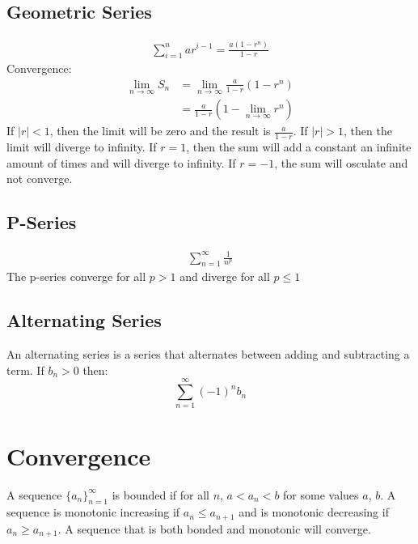 \documentclass{article}
\theoremstyle{mytheoremstyle}
\theoremstyle{mytheoremstyle}
\theoremstyle{myproblemstyle}
\begin{document}
    \subsection*{Geometric Series}
    \begin{align*}
        \sum_{i=1}^{n} ar^{i-1} = \frac{a(1-r^n)}{1-r}
    \end{align*}
    Convergence:
    \begin{align*}
        \lim_{n\to \infty} S_n &= \lim_{n\to \infty} \frac{a}{1-r} (1-r^n) \\
        &= \frac{a}{1-r} (1-\lim_{n\to \infty} r^n)
    \end{align*}
    If $|r|<1$, then the limit will be zero and the result is $\frac{a}{1-r}$.
    If $|r|>1$, then the limit will diverge to infinity. If $r=1$, then the sum
    will add a constant an infinite amount of times and will diverge to
    infinity. If $r=-1$, the sum will osculate and not converge.

    \subsection*{P-Series}
    \begin{align*}
        \sum_{n=1}^{\infty} \frac{1}{n^p}
    \end{align*}
    The p-series converge for all $p>1$ and diverge for all $p\le 1$

    \subsection*{Alternating Series}
    An alternating series is a series that alternates between adding and
    subtracting a term. If $b_n>0$ then:
    \[
        \sum_{n=1}^{\infty} (-1)^n b_n
    \]

    \section*{Convergence}
    A sequence $\{a_n\}_{n=1}^{\infty}$ is bounded if for all $n$, $a < a_n < b$
    for some values $a$, $b$. A sequence is monotonic increasing if $a_n \le
    a_{n+1}$ and is monotonic decreasing if $a_n \ge a_{n+1}$. A sequence that
    is both bonded and monotonic will converge.
\end{document}
